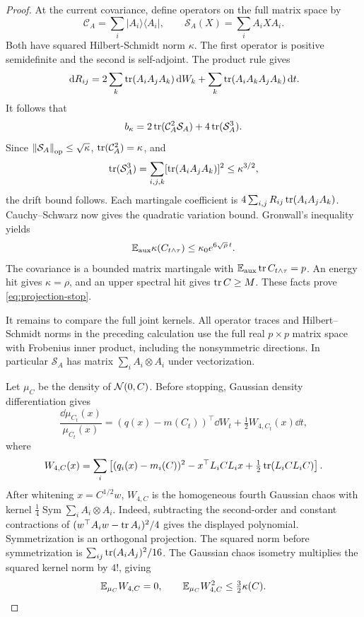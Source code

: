 \begin{proof}
At the current covariance, define operators on the full matrix space by
\[
 \mathcal C_A=\sum_i|A_i\rangle\langle A_i|,
 \qquad \mathcal S_A(X)=\sum_i A_iXA_i.
\]
Both have squared Hilbert-Schmidt norm $\kappa$.
The first operator is positive semidefinite and the second is self-adjoint.
The product rule gives
\[
 \,\mathrm d R_{ij}
 =2\sum_k\operatorname{tr}(A_iA_jA_k)\,\mathrm d W_k
    +\sum_k\operatorname{tr}(A_iA_kA_jA_k)\,\mathrm d t.
\]
It follows that
\[
 b_\kappa=2\operatorname{tr}(\mathcal C_A^2\mathcal S_A)
             +4\operatorname{tr}(\mathcal S_A^3).
\]
Since $\left\lVert\mathcal S_A\right\rVert_{\mathrm{op}}\le\sqrt\kappa$,
$\operatorname{tr}(\mathcal C_A^2)=\kappa$, and
\[
 \operatorname{tr}(\mathcal S_A^3)
   =\sum_{i,j,k}[\operatorname{tr}(A_iA_jA_k)]^2\le\kappa^{3/2},
\]
the drift bound follows. Each martingale coefficient is
\(4\sum_{i,j}R_{ij}\operatorname{tr}(A_iA_jA_k)\).
Cauchy--Schwarz now gives the quadratic variation bound.
Gronwall's inequality yields
\[
 \mathbb E_{\mathrm{aux}}\kappa(C_{t\wedge\tau})
 \le\kappa_0 e^{6\sqrt\rho\,t}.
\]
The covariance is a bounded matrix martingale with
$\mathbb E_{\mathrm{aux}}\operatorname{tr} C_{t\wedge\tau}=p$.
An energy hit gives $\kappa=\rho$, and an upper spectral hit gives $\operatorname{tr} C\ge M$.
These facts prove \cref{eq:projection-stop}.

It remains to compare the full joint kernels. All operator traces and Hilbert--Schmidt norms in the preceding calculation use the full real $p\times p$ matrix space with Frobenius inner product, including the nonsymmetric directions. In particular $\mathcal S_A$ has matrix $\sum_i A_i\otimes A_i$ under vectorization.

Let $\mu_C$ be the density of
$\mathcal N(0,C)$. Before stopping, Gaussian density differentiation gives
\begin{equation}
 \frac{\dd\mu_{C_t}(x)}{\mu_{C_t}(x)}
 =(q(x)-m(C_t))^\top\dd W_t+\tfrac12 W_{4,C_t}(x)\dd t,
 \label{eq:gaussian-density-flow}
\end{equation}
where
\[
 W_{4,C}(x)
 =\sum_i\left[
   (q_i(x)-m_i(C))^2-x^\top L_iCL_ix
                  +\tfrac12\operatorname{tr}(L_iCL_iC)\right].
\]
After whitening $x=C^{1/2}w$, $W_{4,C}$ is the homogeneous fourth Gaussian chaos with kernel $\tfrac14\operatorname{Sym}\sum_i A_i\otimes A_i$. Indeed, subtracting the second-order and constant contractions of $(w^\top A_iw-\operatorname{tr} A_i)^2/4$ gives the displayed polynomial. Symmetrization is an orthogonal projection. The squared norm before symmetrization is $\sum_{ij}\operatorname{tr}(A_iA_j)^2/16$. The Gaussian chaos isometry multiplies the squared kernel norm by $4!$, giving
\begin{equation}
 \mathbb E_{\mu_C}W_{4,C}=0,\qquad
 \mathbb E_{\mu_C}W_{4,C}^2\le\tfrac32\kappa(C).
 \label{eq:wick-moment}
\end{equation}


\end{proof}
